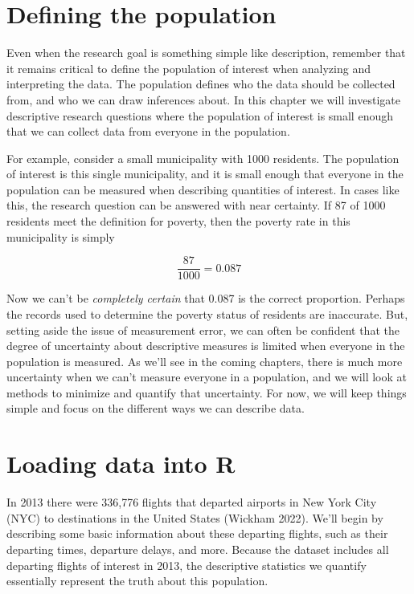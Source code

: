 \documentclass[
]{book}
\begin{document}
\section{Defining the population}\label{defining-the-population}

Even when the research goal is something simple like description, remember that it remains critical to define the population of interest when analyzing and interpreting the data. The population defines who the data should be collected from, and who we can draw inferences about. In this chapter we will investigate descriptive research questions where the population of interest is small enough that we can collect data from everyone in the population.

For example, consider a small municipality with 1000 residents. The population of interest is this single municipality, and it is small enough that everyone in the population can be measured when describing quantities of interest. In cases like this, the research question can be answered with near certainty. If 87 of 1000 residents meet the definition for poverty, then the poverty rate in this municipality is simply

\[
\frac{87}{1000} = 0.087
\]

Now we can't be \emph{completely certain} that 0.087 is the correct proportion. Perhaps the records used to determine the poverty status of residents are inaccurate. But, setting aside the issue of measurement error, we can often be confident that the degree of uncertainty about descriptive measures is limited when everyone in the population is measured. As we'll see in the coming chapters, there is much more uncertainty when we can't measure everyone in a population, and we will look at methods to minimize and quantify that uncertainty. For now, we will keep things simple and focus on the different ways we can describe data.

\section{Loading data into R}\label{loading-data-into-r}

In 2013 there were 336,776 flights that departed airports in New York City (NYC) to destinations in the United States (Wickham 2022). We'll begin by describing some basic information about these departing flights, such as their departing times, departure delays, and more. Because the dataset includes all departing flights of interest in 2013, the descriptive statistics we quantify essentially represent the truth about this population.
\end{document}

